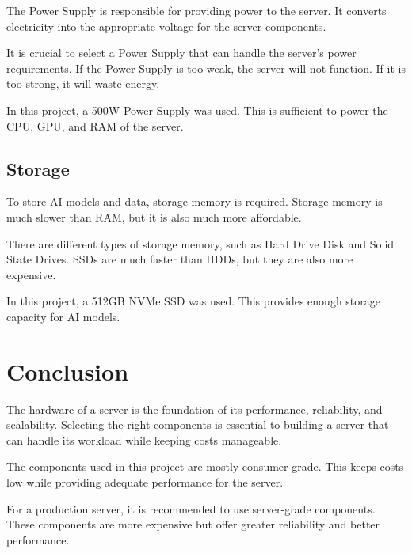 The Power Supply is responsible for providing power to the server. It converts electricity into the appropriate voltage for the server components.

It is crucial to select a Power Supply that can handle the server's power requirements. If the Power Supply is too weak, the server will not function. If it is too strong, it will waste energy.

In this project, a 500W Power Supply was used. This is sufficient to power the CPU, GPU, and RAM of the server.

\cite{PowerSupply}

\subsection{Storage}

To store AI models and data, storage memory is required. Storage memory is much slower than RAM, but it is also much more affordable. 

There are different types of storage memory, such as Hard Drive Disk and Solid State Drives. SSDs are much faster than HDDs, but they are also more expensive.

In this project, a 512GB NVMe SSD was used. This provides enough storage capacity for AI models.

\cite{DataStorage}

\section{Conclusion}

The hardware of a server is the foundation of its performance, reliability, and scalability. Selecting the right components is essential to building a server that can handle its workload while keeping costs manageable.

The components used in this project are mostly consumer-grade. This keeps costs low while providing adequate performance for the server.

For a production server, it is recommended to use server-grade components. These components are more expensive but offer greater reliability and better performance.
